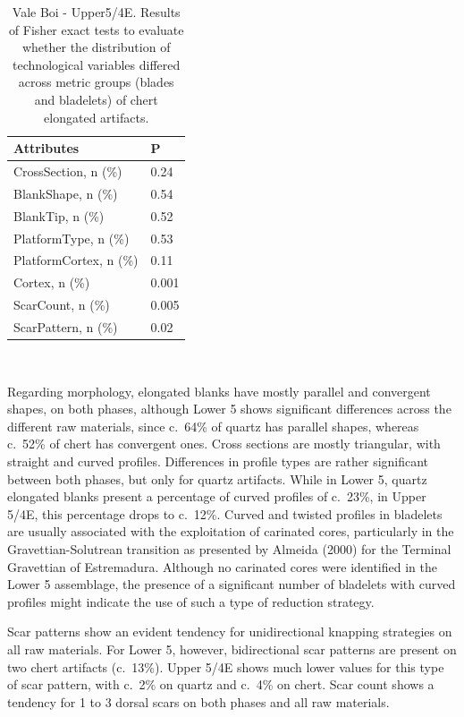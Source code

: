 \documentclass[12pt,twoside]{reedthesis}
\begin{document}
\begin{table}[!h]

\caption{\label{tab:fisherelongVB2}Vale Boi - Upper5/4E. Results of Fisher exact tests to evaluate whether the distribution of technological variables differed across metric groups (blades and bladelets) of chert elongated artifacts.}
\centering
\fontsize{9}{11}\selectfont
\begin{tabular}[t]{ll}
\toprule
Attributes & P\\
\midrule
CrossSection, n (\%) & 0.24\\
BlankShape, n (\%) & 0.54\\
BlankTip, n (\%) & 0.52\\
PlatformType, n (\%) & 0.53\\
PlatformCortex, n (\%) & 0.11\\
\addlinespace
Cortex, n (\%) & 0.001\\
ScarCount, n (\%) & 0.005\\
ScarPattern, n (\%) & 0.02\\
\bottomrule
\end{tabular}
\end{table}
~

Regarding morphology, elongated blanks have mostly parallel and convergent shapes, on both phases, although Lower 5 shows significant differences across the different raw materials, since c.~64\% of quartz has parallel shapes, whereas c.~52\% of chert has convergent ones. Cross sections are mostly triangular, with straight and curved profiles. Differences in profile types are rather significant between both phases, but only for quartz artifacts. While in Lower 5, quartz elongated blanks present a percentage of curved profiles of c.~23\%, in Upper 5/4E, this percentage drops to c.~12\%. Curved and twisted profiles in bladelets are usually associated with the exploitation of carinated cores, particularly in the Gravettian-Solutrean transition as presented by Almeida (2000) for the Terminal Gravettian of Estremadura. Although no carinated cores were identified in the Lower 5 assemblage, the presence of a significant number of bladelets with curved profiles might indicate the use of such a type of reduction strategy.

Scar patterns show an evident tendency for unidirectional knapping strategies on all raw materials. For Lower 5, however, bidirectional scar patterns are present on two chert artifacts (c.~13\%). Upper 5/4E shows much lower values for this type of scar pattern, with c.~2\% on quartz and c.~4\% on chert. Scar count shows a tendency for 1 to 3 dorsal scars on both phases and all raw materials.
\end{document}
